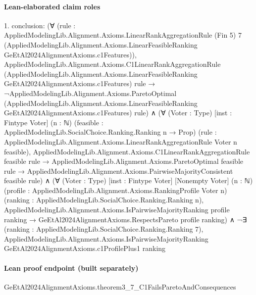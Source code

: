\documentclass[10pt]{article}
\begin{document}
\paragraph{Lean-elaborated claim roles}\begin{ReviewVerbatim}
1. conclusion: (∀
    (rule :
      AppliedModelingLib.Alignment.Axioms.LinearRankAggregationRule (Fin 5) 7
        (AppliedModelingLib.Alignment.Axioms.LinearFeasibleRanking GeEtAl2024AlignmentAxioms.c1Features)),
    AppliedModelingLib.Alignment.Axioms.C1LinearRankAggregationRule
        (AppliedModelingLib.Alignment.Axioms.LinearFeasibleRanking GeEtAl2024AlignmentAxioms.c1Features) rule →
      ¬AppliedModelingLib.Alignment.Axioms.ParetoOptimal
          (AppliedModelingLib.Alignment.Axioms.LinearFeasibleRanking GeEtAl2024AlignmentAxioms.c1Features) rule) ∧
  (∀ (Voter : Type) [inst : Fintype Voter] (n : ℕ) (feasible : AppliedModelingLib.SocialChoice.Ranking.Ranking n → Prop)
      (rule : AppliedModelingLib.Alignment.Axioms.LinearRankAggregationRule Voter n feasible),
      AppliedModelingLib.Alignment.Axioms.C1LinearRankAggregationRule feasible rule →
        AppliedModelingLib.Alignment.Axioms.ParetoOptimal feasible rule →
          AppliedModelingLib.Alignment.Axioms.PairwiseMajorityConsistent feasible rule) ∧
    (∀ (Voter : Type) [inst : Fintype Voter] [Nonempty Voter] (n : ℕ)
        (profile : AppliedModelingLib.Alignment.Axioms.RankingProfile Voter n)
        (ranking : AppliedModelingLib.SocialChoice.Ranking.Ranking n),
        AppliedModelingLib.Alignment.Axioms.IsPairwiseMajorityRanking profile ranking →
          GeEtAl2024AlignmentAxioms.RespectsPareto profile ranking) ∧
      ¬∃ (ranking : AppliedModelingLib.SocialChoice.Ranking.Ranking 7),
          AppliedModelingLib.Alignment.Axioms.IsPairwiseMajorityRanking GeEtAl2024AlignmentAxioms.c1ProfilePlus1 ranking
\end{ReviewVerbatim}

\paragraph{Lean proof endpoint (built separately)}\begin{ReviewVerbatim}
GeEtAl2024AlignmentAxioms.theorem3_7_C1FailsParetoAndConsequences
\end{ReviewVerbatim}
\end{document}
